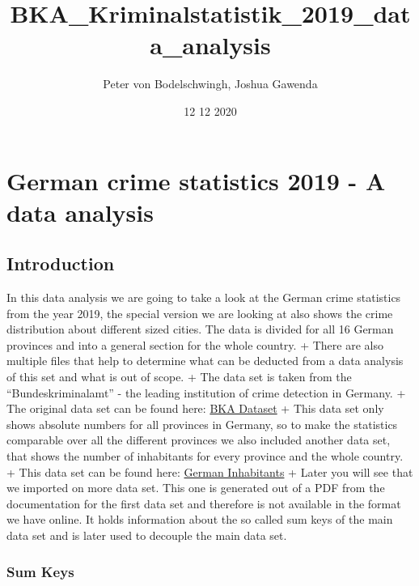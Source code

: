 \documentclass[
]{article}
\title{BKA\_Kriminalstatistik\_2019\_data\_analysis}
\author{Peter von Bodelschwingh, Joshua Gawenda}
\date{12 12 2020}
\begin{document}
\maketitle

\hypertarget{german-crime-statistics-2019---a-data-analysis}{%
\section{German crime statistics 2019 - A data
analysis}\label{german-crime-statistics-2019---a-data-analysis}}

\hypertarget{introduction}{%
\subsection{Introduction}\label{introduction}}

In this data analysis we are going to take a look at the German crime
statistics from the year 2019, the special version we are looking at
also shows the crime distribution about different sized cities. The data
is divided for all 16 German provinces and into a general section for
the whole country. + There are also multiple files that help to
determine what can be deducted from a data analysis of this set and what
is out of scope. + The data set is taken from the ``Bundeskriminalamt''
- the leading institution of crime detection in Germany. + The original
data set can be found here:
\href{https://www.bka.de/DE/AktuelleInformationen/StatistikenLagebilder/PolizeilicheKriminalstatistik/PKS2019/PKSTabellen/LandFalltabellen/landFalltabellen.html}{BKA
Dataset} + This data set only shows absolute numbers for all provinces
in Germany, so to make the statistics comparable over all the different
provinces we also included another data set, that shows the number of
inhabitants for every province and the whole country. + This data set
can be found here:
\href{https://www.destatis.de/DE/Themen/Laender-Regionen/Regionales/Gemeindeverzeichnis/Administrativ/02-bundeslaender.html}{German
Inhabitants} + Later you will see that we imported on more data set.
This one is generated out of a PDF from the documentation for the first
data set and therefore is not available in the format we have online. It
holds information about the so called sum keys of the main data set and
is later used to decouple the main data set.

\hypertarget{sum-keys}{%
\subsubsection{Sum Keys}\label{sum-keys}}
\end{document}
